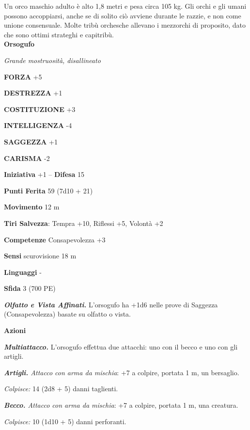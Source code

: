 \begin{multicols}{2}
Un orco maschio adulto è alto 1,8 metri e pesa circa 105 kg. Gli orchi e gli umani possono accoppiarsi, anche se di solito ciò avviene durante le razzie, e non come unione consensuale. Molte tribù orchesche allevano i mezzorchi di proposito, dato che sono ottimi strateghi e capitribù.\\


\medskip{}\textbf{Orsogufo}

\emph{Grande mostruosità, disallineato}

\textbf{FORZA} +5

\textbf{DESTREZZA} +1

\textbf{COSTITUZIONE} +3

\textbf{INTELLIGENZA} -4

\textbf{SAGGEZZA} +1

\textbf{CARISMA} -2

\textbf{Iniziativa} +1 -- \textbf{Difesa} 15

\textbf{Punti Ferita} 59 (7d10 + 21)

\textbf{Movimento} 12 m

\textbf{Tiri Salvezza}: Tempra +10, Riflessi +5, Volontà +2

\textbf{Competenze} Consapevolezza +3

\textbf{Sensi} scurovisione 18 m

\textbf{Linguaggi} -

\textbf{Sfida} 3 (700 PE)

\emph{\textbf{Olfatto e Vista Affinati.}} L'orsogufo ha +1d6 nelle prove di Saggezza (Consapevolezza) basate su olfatto o vista. 

\textbf{Azioni}

\emph{\textbf{Multiattacco.}} L'orsogufo effettua due attacchi: uno con il becco e uno con gli artigli.

\emph{\textbf{Artigli.} Attacco con arma da mischia}: +7 a colpire, portata 1 m, un bersaglio.

\emph{Colpisce:} 14 (2d8 + 5) danni taglienti.

\emph{\textbf{Becco.} Attacco con arma da mischia}: +7 a colpire, portata 1 m, una creatura.

\emph{Colpisce:} 10 (1d10 + 5) danni perforanti.


\end{multicols}
